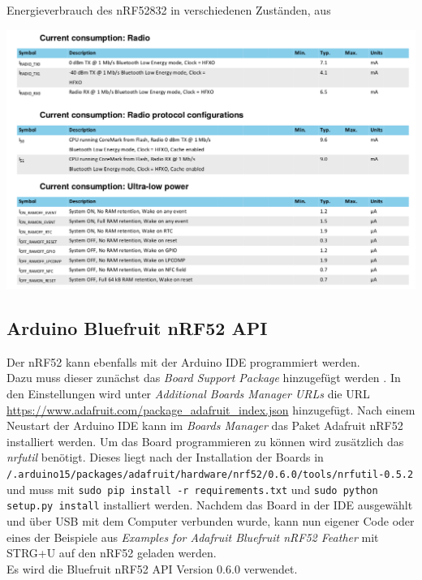 \begin{table}[h]
  \centering
  \caption{Energieverbrauch des nRF52832 in verschiedenen Zuständen, aus \cite{nordic2017nrf}}
	\includegraphics[width=\textwidth]{images/nrf52consumption.png}
  \label{table:nrf52consumption}
\end{table}


\subsection{Arduino Bluefruit nRF52 API}
Der nRF52 kann ebenfalls mit der Arduino IDE programmiert werden.\\
Dazu muss dieser zunächst das \emph{Board Support Package} hinzugefügt werden \cite{townsend2017nrf}.
In den Einstellungen wird unter \textit{Additional Boards Manager URLs} die URL \url{https://www.adafruit.com/package_adafruit_index.json} hinzugefügt.
Nach einem Neustart der Arduino IDE kann im \textit{Boards Manager} das Paket Adafruit nRF52 installiert werden.
Um das Board programmieren zu können wird zusätzlich das \textit{nrfutil} benötigt.
Dieses liegt nach der Installation der Boards in \\\texttt{/.arduino15/packages/adafruit/hardware/nrf52/0.6.0/tools/nrfutil-0.5.2} und muss mit \texttt{sudo pip install -r requirements.txt} und \texttt{sudo python setup.py install} installiert werden.
Nachdem das Board in der IDE ausgewählt und über USB mit dem Computer verbunden wurde, kann nun eigener Code oder eines der Beispiele aus \textit{Examples for Adafruit Bluefruit nRF52 Feather} mit STRG+U auf den nRF52 geladen werden.\\
Es wird die Bluefruit nRF52 API Version 0.6.0 verwendet.



